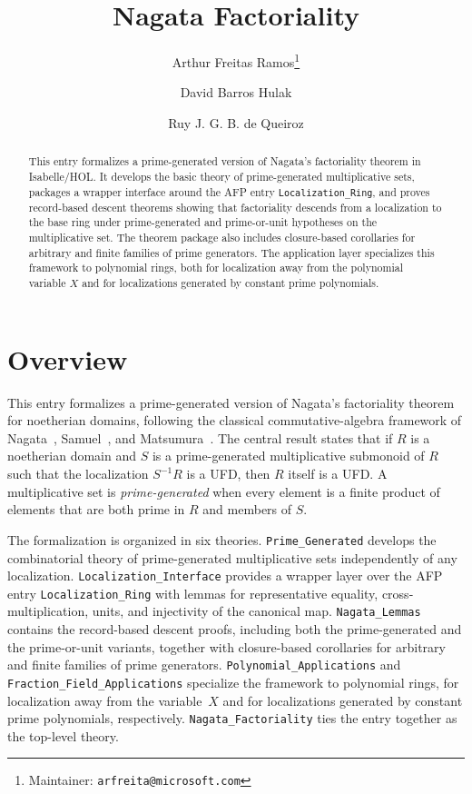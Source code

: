 \documentclass[11pt,a4paper]{article}
\begin{document}
\title{Nagata Factoriality}
\author{
  Arthur Freitas Ramos\thanks{Maintainer: \texttt{arfreita@microsoft.com}}
  \and David Barros Hulak
  \and Ruy J. G. B. de Queiroz
}
\maketitle

\begin{abstract}
  This entry formalizes a prime-generated version of Nagata's factoriality
  theorem in Isabelle/HOL.  It develops the basic theory of prime-generated
  multiplicative sets, packages a wrapper interface around the AFP entry
  \texttt{Localization\_Ring}, and proves record-based descent theorems showing
  that factoriality descends from a localization to the base ring under
  prime-generated and prime-or-unit hypotheses on the multiplicative set.  The
  theorem package also includes closure-based corollaries for arbitrary and
  finite families of prime generators.  The application layer specializes this
  framework to polynomial rings, both for localization away from the
  polynomial variable \(X\) and for localizations generated by constant
  prime polynomials.
\end{abstract}

\tableofcontents

\section{Overview}

This entry formalizes a prime-generated version of Nagata's factoriality
theorem for noetherian domains, following the classical commutative-algebra
framework of Nagata~\cite{Nagata1962}, Samuel~\cite{Samuel1964}, and
Matsumura~\cite{Matsumura1986}.
The central result states that if \(R\) is a noetherian domain and \(S\) is a
prime-generated multiplicative submonoid of \(R\) such that the localization
\(S^{-1}R\) is a UFD, then \(R\) itself is a UFD.  A multiplicative set is
\emph{prime-generated} when every element is a finite product of elements
that are both prime in \(R\) and members of \(S\).

The formalization is organized in six theories.
\texttt{Prime\_Generated} develops the combinatorial theory of prime-generated
multiplicative sets independently of any localization.
\texttt{Localization\_Interface} provides a wrapper layer over the AFP entry
\texttt{Localization\_Ring} with lemmas for representative equality,
cross-multiplication, units, and injectivity of the canonical map.
\texttt{Nagata\_Lemmas} contains the record-based descent proofs, including
both the prime-generated and the prime-or-unit variants, together with
closure-based corollaries for arbitrary and finite families of prime generators.
\texttt{Polynomial\_Applications} and \texttt{Fraction\_Field\_Applications}
specialize the framework to polynomial rings, for localization away from the
variable~\(X\) and for localizations generated by constant prime polynomials,
respectively.  \texttt{Nagata\_Factoriality} ties the entry together as the
top-level theory.





\end{document}
